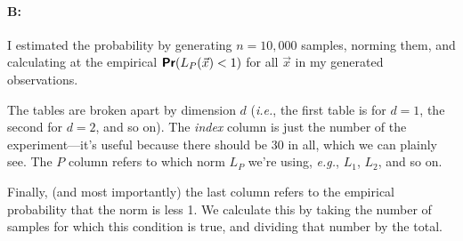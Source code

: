 \documentclass[11pt]{article}
\renewcommand{\Pr}{\textbf{\textsf{Pr}}}
\begin{document}
\paragraph{B:} 

I estimated the probability by generating $n=10,000$ samples, norming them, and calculating at the empirical $\Pr(L_P(\vec{x})  <1)$ for all $\vec{x}$ in my generated observations.

The tables are broken apart by dimension $d$ (\textit{i.e.}, the first table is for $d=1$, the second for $d = 2$, and so on). The \textit{index} column is just the number of the experiment---it's useful because there should be 30 in all, which we can plainly see. The $P$ column refers to which norm $L_P$ we're using, \textit{e.g.}, $L_1$, $L_2$, and so on.

Finally, (and most importantly) the last column refers to the empirical probability that the norm is less 1. We calculate this by taking the number of samples for which this condition is true, and dividing that number by the total.
\end{document}
